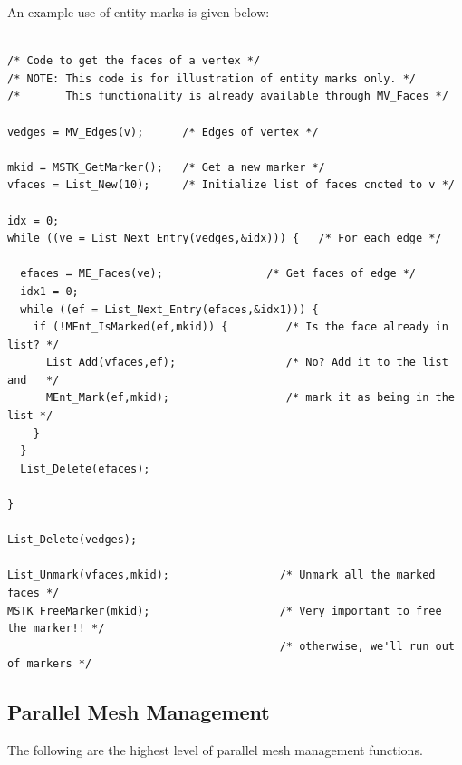 \documentclass[12pt]{article}
\begin{document}
An example use of entity marks is given below:

\newpage
\begin{verbatim}

/* Code to get the faces of a vertex */
/* NOTE: This code is for illustration of entity marks only. */
/*       This functionality is already available through MV_Faces */

vedges = MV_Edges(v);      /* Edges of vertex */

mkid = MSTK_GetMarker();   /* Get a new marker */
vfaces = List_New(10);     /* Initialize list of faces cncted to v */

idx = 0;
while ((ve = List_Next_Entry(vedges,&idx))) {   /* For each edge */

  efaces = ME_Faces(ve);                /* Get faces of edge */
  idx1 = 0;
  while ((ef = List_Next_Entry(efaces,&idx1))) {
    if (!MEnt_IsMarked(ef,mkid)) {         /* Is the face already in list? */
      List_Add(vfaces,ef);                 /* No? Add it to the list and   */
      MEnt_Mark(ef,mkid);                  /* mark it as being in the list */
    }
  }
  List_Delete(efaces);

}

List_Delete(vedges);

List_Unmark(vfaces,mkid);                 /* Unmark all the marked faces */
MSTK_FreeMarker(mkid);                    /* Very important to free the marker!! */
                                          /* otherwise, we'll run out of markers */
\end{verbatim}


\newpage 
\subsection{Parallel Mesh Management}

The following are the highest level of parallel mesh management functions.
\end{document}
